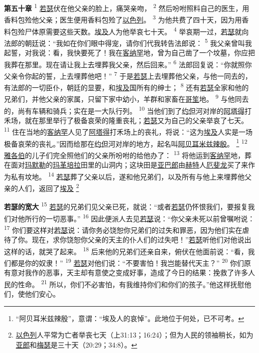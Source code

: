 \textbf{第五十章\quad}
\textsuperscript{1}
\uline{若瑟}伏在他父亲的脸上，痛哭亲吻，
\textsuperscript{2}
然后吩咐照料自己的医生，用香料包殓他父亲；医生便用香料包殓了\uline{以色列}。
\textsuperscript{3}
为他共费了四十天，因为用香料包殓尸体原需要这些天数。\uline{埃及}人为他举哀七十天。
\textsuperscript{4}
举哀期一过，\uline{若瑟}就向法郎的朝廷说：“我如在你们眼中得宠，请你们代我转告法郎说：
\textsuperscript{5}
我父亲曾叫我起誓，对我说：看，我快要死了！我在\uline{客纳罕}地，曾为自己凿了一个坟墓，你应把我葬在那里。现在请让我上去埋葬我父亲，然后回来。”
\textsuperscript{6}
法郎回复说：“你就照你父亲令你起的誓，上去埋葬他吧！”
\textsuperscript{7}
于是\uline{若瑟}上去埋葬他父亲，与他一同去的，有法郎的一切臣仆，朝廷的显要，和\uline{埃及}国所有的绅士；
\textsuperscript{8}
还有\uline{若瑟}全家和他的兄弟们，并他父亲的家属，只留下家中幼小，羊群和家畜在\uline{哥笙}地。
\textsuperscript{9}
与他同去的，尚有车辆和骑兵；实在是一大队行列。
\textsuperscript{10}
当他们到了\uline{约但}河对岸的\uline{阿塔得}打禾场，就在那里举行了极备哀荣的隆重丧礼；\uline{若瑟}又为自己的父亲举哀了七天。
\textsuperscript{11}
住在当地的\uline{客纳罕}人见了\uline{阿塔得}打禾场上的丧礼，将说：“这为\uline{埃及}人实是一场极备哀荣的丧礼。”因而给那在\uline{约但}河对岸的地方，起名叫\uline{阿贝耳}\uline{米兹辣殷}。
\footnote{“阿贝耳米兹辣殷”，意谓：“埃及人的哀悼”。此地位于何处，已不可考。}
\textsuperscript{12}
\uline{雅各伯}的儿子们完全照他们的父亲所吩咐的给他办了：
\textsuperscript{13}
将他运到\uline{客纳罕}地，葬在面对\uline{玛默勒}的\uline{玛革培拉}田里的山洞内；这块田是\uline{亚巴郎}由\uline{赫特}人\uline{厄斐龙}买了来作为私有坟地。
\textsuperscript{14}
\uline{若瑟}葬了父亲以后，遂和他兄弟们，以及所有与他上来埋葬他父亲的人们，返回了\uline{埃及}
\footnote{\uline{以色列}人平常为亡者举丧七天（上31:13；16:24）；但为人民的领袖稍长，如为\uline{亚郎}和\uline{梅瑟}是三十天（20:29；34:8）。}

\textbf{若瑟的宽大\quad}
\textsuperscript{15}
\uline{若瑟}的兄弟们见父亲已死，就说：“或者\uline{若瑟}仍怀恨我们，要报复我们对他所行的一切恶事。”
\textsuperscript{16}
因此便派人去见\uline{若瑟}说：“你父亲未死以前曾嘱咐说：
\textsuperscript{17}
你们要这样对\uline{若瑟}说：请你务必饶恕你兄弟们的过失和罪恶，因为他们实在虐待了你。现在，求你饶恕你父亲的天主的仆人们的过失吧！”\uline{若瑟}听他们对他说出这样的话，就哭了起来。
\textsuperscript{18}
后来他的兄弟们还亲自来，俯伏在他面前说：“看，我们都是你的奴隶！”
\textsuperscript{19}
\uline{若瑟}对他们说：“不要害怕！我岂能替代天主？”
\textsuperscript{20}
你们原有意对我作的恶事，天主却有意使之变成好事，造成了今日的结果：挽救了许多人民的性命。
\textsuperscript{21}
所以，你们不必害怕，有我维持你们和你们的孩子。”他这样抚慰他们，使他们安心。

